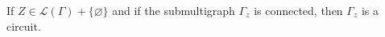 If $Z \in \mathcal{L}(\Gamma) + \{\varnothing\}$ and if the submultigraph $\Gamma_z$ is connected, then $\Gamma_z$ is a circuit.
